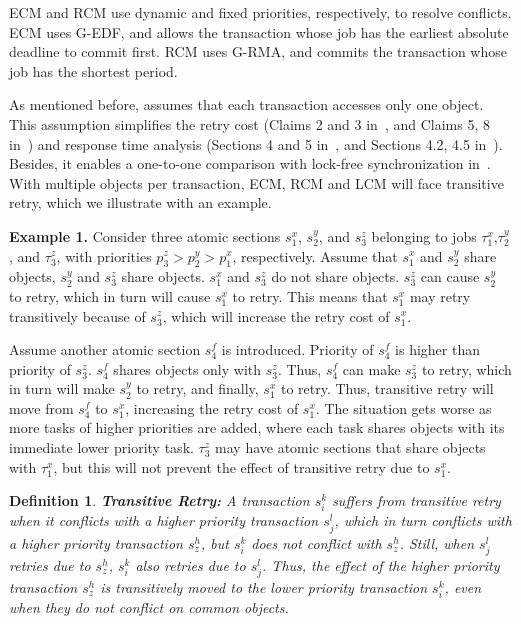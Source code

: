 \documentclass[a4paper,english]{article}
\newtheorem{mydef}{Definition}
\begin{document}
ECM and RCM use dynamic and fixed priorities, respectively, to resolve conflicts. ECM uses G-EDF, and allows the transaction whose job has the earliest absolute deadline to commit first. RCM uses G-RMA, and commits the transaction whose job has the shortest period.

As mentioned before, \cite{stmconcurrencycontrol:emsoft11,lcmdac2012} assumes that each transaction accesses only one object. This assumption simplifies the retry cost (Claims 2 and 3 in~\cite{stmconcurrencycontrol:emsoft11}, and Claims 5, 8 in~\cite{lcmdac2012}) and response time analysis (Sections 4 and 5 in~\cite{stmconcurrencycontrol:emsoft11}, and Sections 4.2, 4.5 in~\cite{lcmdac2012}). Besides, it enables a one-to-one comparison with lock-free synchronization in~\cite{key-5}. With multiple objects per transaction, ECM, RCM and LCM will face transitive retry, which we illustrate with an example.


\textbf{Example 1.} Consider three atomic sections $s_{1}^{x}$, $s_{2}^{y}$, 
and $s_{3}^{z}$ belonging to jobs $\tau_{1}^{x}$,$\tau_{2}^{y}$, 
and $\tau_{3}^{z}$, with priorities $p_{3}^{z}>p_{2}^{y}>p_{1}^{x}$, respectively. 
Assume that $s_{1}^{x}$ and $s_{2}^{y}$ share objects, $s_{2}^{y}$ and $s_{3}^{z}$
share objects. $s_{1}^{x}$ and $s_{3}^{z}$ do not share objects.
$s_{3}^{z}$ can cause $s_{2}^{y}$ to retry, which in turn will cause $s_{1}^{x}$ to retry. 
This means that $s_{1}^{x}$ may retry transitively
because of $s_{3}^{z}$, which will increase the retry cost of $s_{1}^{x}$.

Assume another atomic section $s_4^f$ is introduced. Priority of $s_4^f$ is higher than priority of $s_3^z$. $s_4^f$ shares objects only with $s_3^z$. Thus, $s_4^f$ can make $s_3^z$ to retry, which in turn will make $s_2^y$ to retry, and finally, $s_1^x$ to retry. Thus, transitive retry will move from $s_{4}^{f}$ to $s_{1}^{x}$, increasing the retry cost of $s_{1}^{x}$. 
The situation gets worse as more tasks of higher priorities are added, where each task
shares objects with its immediate lower priority task. $\tau_{3}^{z}$
may have atomic sections that share objects with $\tau_{1}^{x}$,
but this will not prevent the effect of transitive retry due to $s_{1}^{x}$.

\begin{mydef}
\textbf{Transitive Retry:} A transaction $s_{i}^{k}$ suffers from
transitive retry when it conflicts with a higher priority transaction
$s_{j}^{l}$, which in turn conflicts with a higher priority transaction
$s_{z}^{h}$, but $s_{i}^{k}$ does not conflict with $s_{z}^{h}$.
Still, when $s_{j}^{l}$ retries due to $s_{z}^{h}$, $s_{i}^{k}$
also retries due to $s_{j}^{l}$. Thus, the effect of the higher priority
transaction $s_{z}^{h}$ is transitively moved to the lower priority
transaction $s_{i}^{k}$, even when they do not conflict on common objects.
\end{mydef}
\end{document}
